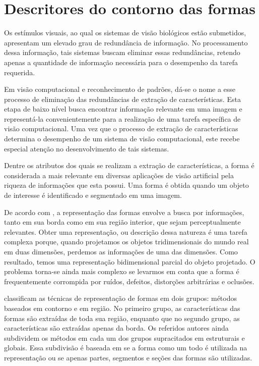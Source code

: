 \section{\label{chap:contour}Descritores do contorno das formas}

Os estímulos visuais, ao qual os sistemas de visão biológicos estão submetidos, apresentam um elevado grau de redundância de informação. No processamento dessa informação, tais sistemas buscam eliminar essas redundâncias, retendo apenas a quantidade de informação necessária para o desempenho da tarefa requerida.  

Em visão computacional e reconhecimento de padrões, dá-se o nome a esse processo de eliminação das redundâncias de extração de características. Esta etapa de baixo nível busca encontrar informação relevante em uma imagem e representá-la convenientemente para a realização de uma tarefa específica de visão computacional. Uma vez que o processo de extração de características determina o desempenho de um sistema de visão computacional, este recebe especial atenção no desenvolvimento de tais sistemas.

Dentre os atributos dos quais se realizam a extração de características, a forma é considerada a mais relevante em diversas aplicações de visão artificial pela riqueza de informações que esta possui. Uma forma é obtida quando um objeto de interesse é identificado e segmentado em uma imagem. 

De acordo com , a representação das formas envolve a busca por informações, tanto em sua borda como em sua região interior, que sejam perceptualmente relevantes. Obter uma representação, ou descrição dessa natureza é uma tarefa complexa porque, quando projetamos os objetos tridimensionais do mundo real em duas dimensões, perdemos as informações de uma das dimensões. Como resultado, temos uma representação bidimensional parcial do objeto projetado. O problema torna-se ainda mais complexo se levarmos em conta que a forma é frequentemente corrompida por ruídos, defeitos, distorções arbitrárias e oclusões.

 classificam as técnicas de representação de formas em dois grupos: métodos baseados em contorno e em região. No primeiro grupo, as características das formas são extraídas de toda sua região, enquanto que no segundo grupo, as características são extraídas apenas da borda. Os referidos autores ainda subdividem os métodos em cada um dos grupos supracitados em estruturais e globais. Essa subdivisão é baseada em se a forma como um todo é utilizada na representação ou se apenas partes, segmentos e seções das formas são utilizadas. 

